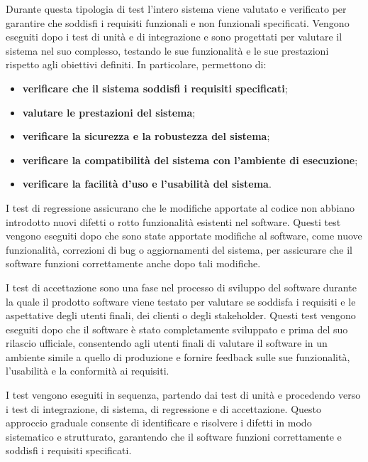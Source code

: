 Durante questa tipologia di test l'intero sistema viene valutato e verificato per garantire che soddisfi i requisiti funzionali e non funzionali specificati. Vengono eseguiti dopo i test di unità e di integrazione e sono progettati per valutare il sistema nel suo complesso, testando le sue funzionalità e le sue prestazioni rispetto agli obiettivi definiti. In particolare, permettono di:
\begin{itemize}
	\item \textbf{verificare che il sistema soddisfi i requisiti specificati};
	\item \textbf{valutare le prestazioni del sistema};
	\item \textbf{verificare la sicurezza e la robustezza del sistema};
	\item \textbf{verificare la compatibilità del sistema con l'ambiente di esecuzione};
	\item \textbf{verificare la facilità d'uso e l'usabilità del sistema}.
\end{itemize}

I test di regressione assicurano che le modifiche apportate al codice non abbiano introdotto nuovi difetti o rotto funzionalità esistenti nel software. Questi test vengono eseguiti dopo che sono state apportate modifiche al software, come nuove funzionalità, correzioni di bug o aggiornamenti del sistema, per assicurare che il software funzioni correttamente anche dopo tali modifiche.

I test di accettazione sono una fase nel processo di sviluppo del software durante la quale il prodotto software viene testato per valutare se soddisfa i requisiti e le aspettative degli utenti finali, dei clienti o degli stakeholder. Questi test vengono eseguiti dopo che il software è stato completamente sviluppato e prima del suo rilascio ufficiale, consentendo agli utenti finali di valutare il software in un ambiente simile a quello di produzione e fornire feedback sulle sue funzionalità, l'usabilità e la conformità ai requisiti.

I test vengono eseguiti in sequenza, partendo dai test di unità e procedendo verso i test di integrazione, di sistema, di regressione e di accettazione. Questo approccio graduale consente di identificare e risolvere i difetti in modo sistematico e strutturato, garantendo che il software funzioni correttamente e soddisfi i requisiti specificati.

